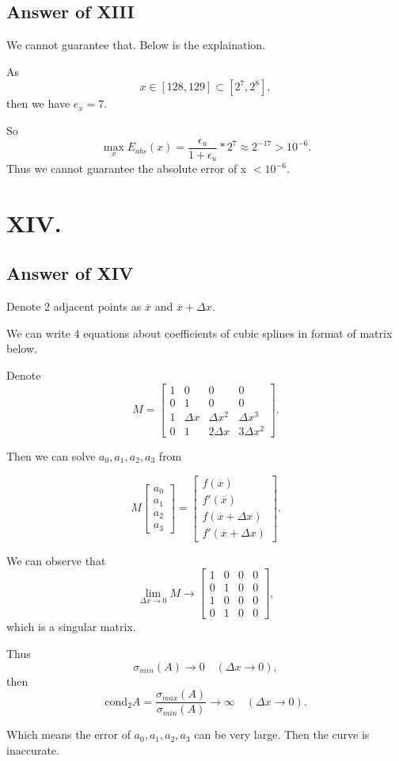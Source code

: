 \documentclass[a4paper]{article}
\begin{document}
\subsection*{Answer of XIII}
We cannot guarantee that. Below is the explaination.

As$$x \in [128,129] \subset [2^7,2^8],$$
then we have $e_x=7$.

So $$\max_x E_{abs}(x)=\frac{\epsilon_u}{1+\epsilon_u}*2^7\approx2^{-17}>10^{-6}.$$
Thus we cannot guarantee the absolute error of x $<10^{-6}$.

\section*{XIV.}

\subsection*{Answer of XIV}
Denote 2 adjacent points as $\overline{x}$ and $\overline{x}+\Delta x$.

We can write 4 equations about coefficients of cubic splines in format of matrix below.

Denote
$$
M=\begin{bmatrix}
    1 & 0 & 0 & 0 \\
    0 & 1 & 0 & 0 \\
    1 & \Delta x & \Delta x^2 & \Delta x^3 \\
    0 & 1 & 2\Delta x & 3\Delta x^2
    \end{bmatrix}
    .
$$

Then we can solve $a_0,a_1,a_2,a_3$ from

$$
M
\begin{bmatrix}
a_0 \\ a_1 \\ a_2 \\ a_3
\end{bmatrix}
=
\begin{bmatrix}
f(\overline{x}) \\ f'(\overline{x}) \\ f(\overline{x} + \Delta x) \\ f'(\overline{x} + \Delta x)
\end{bmatrix}
.
$$

We can observe that 
$$\lim_{\Delta x \to 0}M \to 
\begin{bmatrix}
    1 & 0 & 0 & 0 \\
    0 & 1 & 0 & 0 \\
    1 & 0 & 0 & 0 \\
    0 & 1 & 0 & 0
    \end{bmatrix}
    ,
$$
which is a singular matrix.

Thus $$\sigma_{min}(A) \to 0 \quad (\Delta x \to 0),$$
then $$\text{cond}_2A=\frac{\sigma_{max}(A)}{\sigma_{min}(A)} \to \infty \quad (\Delta x \to 0).$$ 

Which means the error of $a_0,a_1,a_2,a_3$ can be very large. Then the curve is inaccurate.

\printbibliography
\end{document}
